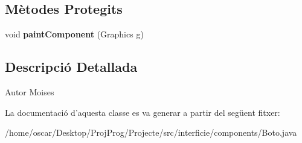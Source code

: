 \subsection*{Mètodes Protegits}
\begin{DoxyCompactItemize}
\item 
\hypertarget{classinterficie_1_1components_1_1_boto_a21d4ca15f35fdfee7083629b8cab378f}{void {\bfseries paint\+Component} (Graphics g)}\label{classinterficie_1_1components_1_1_boto_a21d4ca15f35fdfee7083629b8cab378f}

\end{DoxyCompactItemize}


\subsection{Descripció Detallada}
\begin{DoxyAuthor}{Autor}
Moises 
\end{DoxyAuthor}


La documentació d'aquesta classe es va generar a partir del següent fitxer\+:\begin{DoxyCompactItemize}
\item 
/home/oscar/\+Desktop/\+Proj\+Prog/\+Projecte/src/interficie/components/Boto.\+java\end{DoxyCompactItemize}
